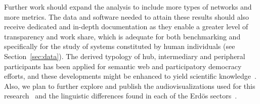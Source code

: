 \documentclass[%
	aip,
	jmp,%
	amsmath,amssymb,
	reprint,%
]{revtex4-1}
\begin{document}
																																																																																					Further work should expand the analysis to include
																																																																																					more types of networks and more metrics.
																																																																																					The data and software needed to attain these results
																																																																																					should also receive dedicated and in-depth
																																																																																					documentation as they enable a greater level of transparency
																																																																																					and work share,
																																																																																					which is adequate for both benchmarking
																																																																																					and specifically for the study of systems constituted
																																																																																					by human individuals (see Section~\ref{sec:data}).
																																																																																					The derived typology of hub, intermediary and peripheral participants
																																																																																					has been applied for semantic web and participatory democracy efforts,
																																																																																					and these developments might be enhanced to yield scientific knowledge~\cite{opa}.
																																																																																					Also, we plan to further explore and publish the audiovisualizations
																																																																																					used for this research~\cite{versinus,animacoes} and
																																																																																					the linguistic differences found in each of the Erd\"os sectors~\cite{rcText}.


\end{document}
